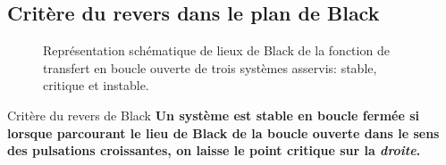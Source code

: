 \subsection{Critère du revers dans le plan de Black
}
\acpl
\begin{figure}[!h]
    \centering
    
    \caption{Représentation schématique de lieux de Black de la 
             fonction de transfert en boucle ouverte de trois systèmes 
             asservis: stable, critique et instable.
             \label{fig-black_revers}}
\end{figure}
\begin{criteria}{Critère du revers de Black}
\textbf{Un système est stable en boucle fermée si lorsque parcourant 
        le lieu de Black de la boucle ouverte dans le sens des 
        pulsations croissantes, on laisse le point critique sur 
        la \emph{droite}.}
\end{criteria}
\newpage
